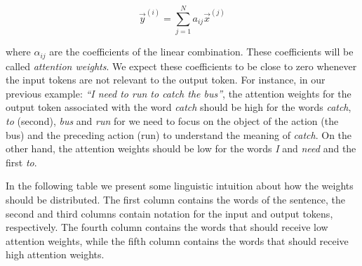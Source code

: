 \[ \vec{y}^{(i)} = \sum_{j=1}^N a_{ij} \vec{x}^{(j)} \]

where $\alpha_{ij}$ are the coefficients of the linear combination. These coefficients will be called \emph{attention weights}. We expect these coefficients to be close to zero whenever the input tokens are not relevant to the output token. For instance, in our previous example: \emph{``I need to run to catch the bus''}, the attention weights for the output token associated with the word \textit{catch} should be high for the words \textit{catch}, \textit{to} (second), \textit{bus} and \textit{run} for we need to focus on the object of the action (the bus) and the preceding action (run) to understand the meaning of \textit{catch}. On the other hand, the attention weights should be low for the words \textit{I} and \textit{need} and the first \textit{to}.    

In the following  table we present some linguistic intuition about how the weights should be distributed. The first column contains the words of the sentence, the second and third columns contain notation for the input and output tokens, respectively. The fourth column contains the words that should receive low attention weights, while the fifth column contains the words that should receive high attention weights.

